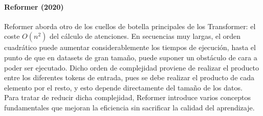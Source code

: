 \paragraph{Reformer (2020)}

Reformer \cite{kitaev2020reformerefficienttransformer} aborda otro de los cuellos de botella principales de los Transformer: el coste $O(n^2)$ del cálculo de atenciones. En secuencias muy largas, el orden cuadrático puede aumentar considerablemente los tiempos de ejecución, hasta el punto de que en datasets de gran tamaño, puede suponer un obstáculo de cara a poder ser ejecutado. Dicho orden de complejidad proviene de realizar el producto entre los diferentes tokens de entrada, pues se debe realizar el producto de cada elemento por el resto, y esto depende directamente del tamaño de los datos.\\


Para tratar de reducir dicha complejidad, Reformer introduce varios conceptos fundamentales que mejoran la eficiencia sin sacrificar la calidad del aprendizaje.

